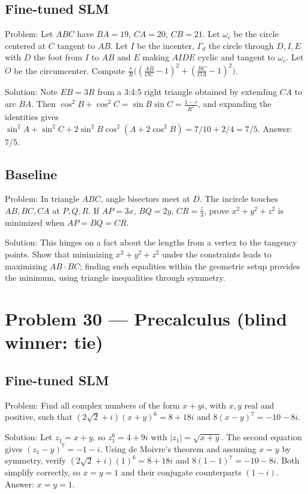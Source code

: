 \documentclass[11pt]{article}
\begin{document}
\subsection*{Fine-tuned SLM}

Problem:
Let $ABC$ have $BA=19$, $CA=20$, $CB=21$. Let $\omega_c$ be the circle centered at $C$ tangent to $AB$. Let $I$ be the incenter, $\Gamma_d$ the circle through $D,I,E$ with $D$ the foot from $I$ to $AB$ and $E$ making $AIDE$ cyclic and tangent to $\omega_c$. Let $O$ be the circumcenter. Compute $\frac{r}{R}\big((\frac{AB}{OC}-1)^2+(\frac{BC}{OA}-1)^2\big)$.

Solution:
Note $EB=3R$ from a 3:4:5 right triangle obtained by extending $CA$ to arc $BA$. Then $\cos^2 B+\cos^2 C=\sin B\sin C=\frac{1-r}{R^2}$, and expanding the identities gives $\sin^2 A+\sin^2 C+2\sin^2 B\cos^2(A+2\cos^2 B)=7/10+2/4=7/5$. Answer: 7/5.

\subsection*{Baseline}

Problem:
In triangle $ABC$, angle bisectors meet at $D$. The incircle touches $AB,BC,CA$ at $P,Q,R$. If $AP=3x$, $BQ=2y$, $CR=\frac z3$, prove $x^2+y^2+z^2$ is minimized when $AP=BQ=CR$.

Solution:
This hinges on a fact about the lengths from a vertex to the tangency points. Show that minimizing $x^2+y^2+z^2$ under the constraints leads to maximizing $AB\cdot BC$; finding such equalities within the geometric setup provides the minimum, using triangle inequalities through symmetry.

\section*{Problem 30 --- Precalculus \quad(blind winner: tie)}

\subsection*{Fine-tuned SLM}

Problem:
Find all complex numbers of the form $x + yi$, with $x,y$ real and positive, such that $(2\sqrt{2}+i)(x+y)^6 = 8 + 18i$ and $8(x-y)^7 = -10 - 8i$.

Solution:
Let $z_1=x+y$, so $z_1^6=4+9i$ with $|z_1|=\sqrt{x+y}$. The second equation gives $(z_1-y)^7=-1-i$. Using de Moivre's theorem and assuming $x=y$ by symmetry, verify $(2\sqrt2+i)(1)^6=8+18i$ and $8(1-1)^7=-10-8i$. Both simplify correctly, so $x=y=1$ and their conjugate counterparts $\boxed{(1-i)}$. Answer: $x=y=1$.
\end{document}
